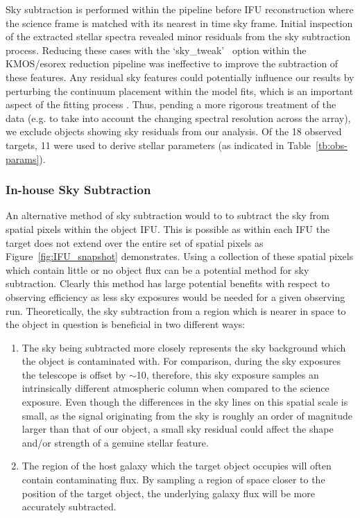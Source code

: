 Sky subtraction is performed within the pipeline before IFU reconstruction where the science frame is matched with its nearest in time sky frame.
Initial inspection of the extracted stellar spectra revealed minor residuals from the sky subtraction process.
Reducing these cases with the \textquoteleft sky\_tweak\textquoteright
~option within the KMOS/esorex reduction pipeline was ineffective to improve the subtraction of these features.
Any residual sky features could potentially influence our results by perturbing the continuum placement within the model fits, which is an important aspect of the fitting process
\citep[see][for more discussion]{2014ApJ...788...58G,2015ApJ...806...21D}.
Thus, pending a more rigorous treatment of the data
(e.g. to take into account the changing spectral resolution across the array),
we exclude objects showing sky residuals from our analysis.
Of the 18 observed targets, 11 were used to derive stellar parameters
(as indicated in Table~\ref{tb:obs-params}).

\subsubsection{In-house Sky Subtraction} %
\label{sub:in_house_sky_subtraction}

An alternative method of sky subtraction would to to subtract the sky from spatial pixels within the object IFU.
This is possible as within each IFU the target does not extend over the entire set of spatial pixels as Figure~\ref{fig:IFU_snapshot} demonstrates.
Using a collection of these spatial pixels which contain little or no object flux can be a potential method for sky subtraction.
Clearly this method has large potential benefits with respect to observing efficiency as less sky exposures would be needed for a given observing run.
Theoretically, the sky subtraction from a region which is nearer in space to the object in question is beneficial in two different ways:

\begin{enumerate}
  \item The sky being subtracted more closely represents the sky background which the object is contaminated with.
For comparison, during the sky exposures the telescope is offset by $\sim$10, therefore, this sky exposure samples an intrinsically different atmospheric column when compared to the science exposure.
Even though the differences in the sky lines on this spatial scale is small, as the signal originating from the sky is roughly an order of magnitude larger than that of our object, a small sky residual could affect the shape and/or strength of a genuine stellar feature.
\item The region of the host galaxy which the target object occupies will often contain contaminating flux.
By sampling a region of space closer to the position of the target object, the underlying galaxy flux will be more accurately subtracted.
\end{enumerate}

